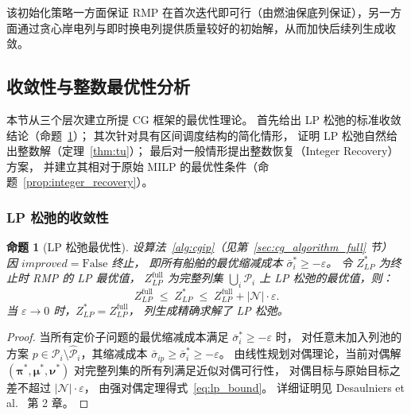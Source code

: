 \documentclass[UTF8, a4paper, 12pt]{ctexart}
\newtheorem{proposition}{命题}
\begin{document}
\noindent
该初始化策略一方面保证 RMP 在首次迭代即可行（由燃油保底列保证），另一方面通过贪心岸电列与即时换电列提供质量较好的初始解，从而加快后续列生成收敛。

\subsection{收敛性与整数最优性分析}
\label{sec:cg_convergence}

本节从三个层次建立所提 CG 框架的最优性理论。
首先给出 LP 松弛的标准收敛结论（命题~\ref{prop:lp}）；
其次针对具有区间调度结构的简化情形，
证明 LP 松弛自然给出整数解（定理~\ref{thm:tu}）；
最后对一般情形提出整数恢复（Integer Recovery）方案，
并建立其相对于原始 MILP 的最优性条件（命题~\ref{prop:integer_recovery}）。

\subsubsection{LP 松弛的收敛性}

\begin{proposition}[LP 松弛最优性]
\label{prop:lp}
设算法~\ref{alg:cgip}（见第~\ref{sec:cg_algorithm_full} 节）
因 $\textit{improved} = \mathrm{False}$ 终止，
即所有船舶的最优缩减成本 $\bar{\sigma}_i^* \ge -\varepsilon$。
令 $Z_{LP}^*$ 为终止时 RMP 的 LP 最优值，
$Z_{LP}^{\text{full}}$ 为完整列集 $\bigcup_i \mathcal{P}_i$ 上 LP 松弛的最优值，则：
\begin{equation}
  Z_{LP}^{\text{full}} \;\le\; Z_{LP}^* \;\le\; Z_{LP}^{\text{full}} + |\mathcal{N}|\cdot\varepsilon.
  \label{eq:lp_bound}
\end{equation}
当 $\varepsilon\to 0$ 时，$Z_{LP}^* = Z_{LP}^{\text{full}}$，
列生成精确求解了 LP 松弛。
\end{proposition}

\begin{proof}
当所有定价子问题的最优缩减成本满足 $\bar{\sigma}_i^*\ge -\varepsilon$ 时，
对任意未加入列池的方案 $p\in\mathcal{P}_i\setminus\hat{\mathcal{P}}_i$，其缩减成本
$\bar{\sigma}_{ip}\ge\bar{\sigma}_i^*\ge -\varepsilon$。
由线性规划对偶理论，当前对偶解
$(\boldsymbol{\pi}^*,\boldsymbol{\mu}^*,\boldsymbol{\nu}^*)$
对完整列集的所有列满足近似对偶可行性，
对偶目标与原始目标之差不超过 $|\mathcal{N}|\cdot\varepsilon$，
由强对偶定理得式~\eqref{eq:lp_bound}。
详细证明见 Desaulniers et al.~\cite{Desaulniers2005} 第 2 章。
\end{proof}
\end{document}
